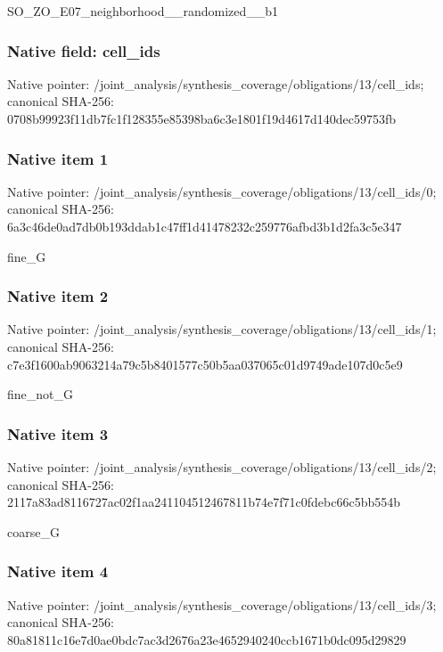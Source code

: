 \documentclass[10pt,a4paper]{article}
\begin{document}
\begingroup\raggedright\sloppy SO\_\allowbreak{}ZO\_\allowbreak{}E07\_\allowbreak{}neighborhood\_\allowbreak{}\_\allowbreak{}randomized\_\allowbreak{}\_\allowbreak{}b1\par\endgroup

\subsubsection{Native field: cell\_\allowbreak{}ids}
Native pointer: /joint\_\allowbreak{}analysis/synthesis\_\allowbreak{}coverage/obligations/13/cell\_\allowbreak{}ids; canonical SHA-256: 0708b99923f11db7fc1f128355e85398ba6c3e1801f19d4617d140dec59753fb

\subsubsection{Native item 1}
Native pointer: /joint\_\allowbreak{}analysis/synthesis\_\allowbreak{}coverage/obligations/13/cell\_\allowbreak{}ids/0; canonical SHA-256: 6a3c46de0ad7db0b193ddab1c47ff1d41478232c259776afbd3b1d2fa3c5e347

\begingroup\raggedright\sloppy fine\_\allowbreak{}G\par\endgroup

\subsubsection{Native item 2}
Native pointer: /joint\_\allowbreak{}analysis/synthesis\_\allowbreak{}coverage/obligations/13/cell\_\allowbreak{}ids/1; canonical SHA-256: c7e3f1600ab9063214a79c5b8401577c50b5aa037065c01d9749ade107d0c5e9

\begingroup\raggedright\sloppy fine\_\allowbreak{}not\_\allowbreak{}G\par\endgroup

\subsubsection{Native item 3}
Native pointer: /joint\_\allowbreak{}analysis/synthesis\_\allowbreak{}coverage/obligations/13/cell\_\allowbreak{}ids/2; canonical SHA-256: 2117a83ad8116727ac02f1aa241104512467811b74e7f71c0fdebc66c5bb554b

\begingroup\raggedright\sloppy coarse\_\allowbreak{}G\par\endgroup

\subsubsection{Native item 4}
Native pointer: /joint\_\allowbreak{}analysis/synthesis\_\allowbreak{}coverage/obligations/13/cell\_\allowbreak{}ids/3; canonical SHA-256: 80a81811c16e7d0ae0bdc7ac3d2676a23e4652940240ccb1671b0dc095d29829
\end{document}
